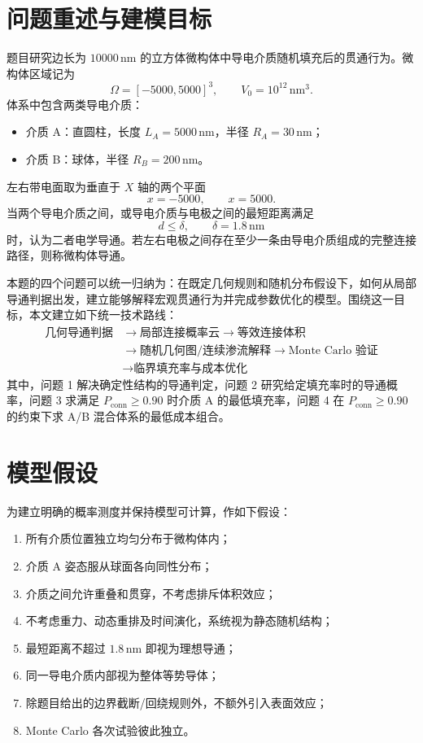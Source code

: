 
\section{问题重述与建模目标}

题目研究边长为 $10000\,\mathrm{nm}$ 的立方体微构体中导电介质随机填充后的贯通行为。微构体区域记为
\[
\Omega=[-5000,5000]^3,\qquad V_0=10^{12}\,\mathrm{nm}^3.
\]
体系中包含两类导电介质：
\begin{itemize}
    \item 介质 A：直圆柱，长度 $L_A=5000\,\mathrm{nm}$，半径 $R_A=30\,\mathrm{nm}$；
    \item 介质 B：球体，半径 $R_B=200\,\mathrm{nm}$。
\end{itemize}
左右带电面取为垂直于 $X$ 轴的两个平面
\[
x=-5000,\qquad x=5000.
\]
当两个导电介质之间，或导电介质与电极之间的最短距离满足
\[
d\le \delta,\qquad \delta=1.8\,\mathrm{nm}
\]
时，认为二者电学导通。若左右电极之间存在至少一条由导电介质组成的完整连接路径，则称微构体导通。

本题的四个问题可以统一归纳为：在既定几何规则和随机分布假设下，如何从局部导通判据出发，建立能够解释宏观贯通行为并完成参数优化的模型。围绕这一目标，本文建立如下统一技术路线：
\[
\boxed{
\begin{aligned}
\text{几何导通判据}
&\rightarrow
\text{局部连接概率云}
\rightarrow
\text{等效连接体积}\\
&\rightarrow
\text{随机几何图/连续渗流解释}
\rightarrow
\text{Monte Carlo 验证}\\
&\rightarrow
\text{临界填充率与成本优化}
\end{aligned}
}
\]
其中，问题 1 解决确定性结构的导通判定，问题 2 研究给定填充率时的导通概率，问题 3 求满足 $P_{\mathrm{conn}}\ge 0.90$ 时介质 A 的最低填充率，问题 4 在 $P_{\mathrm{conn}}\ge 0.90$ 的约束下求 A/B 混合体系的最低成本组合。

\section{模型假设}

为建立明确的概率测度并保持模型可计算，作如下假设：
\begin{enumerate}
    \item 所有介质位置独立均匀分布于微构体内；
    \item 介质 A 姿态服从球面各向同性分布；
    \item 介质之间允许重叠和贯穿，不考虑排斥体积效应；
    \item 不考虑重力、动态重排及时间演化，系统视为静态随机结构；
    \item 最短距离不超过 $1.8\,\mathrm{nm}$ 即视为理想导通；
    \item 同一导电介质内部视为整体等势导体；
    \item 除题目给出的边界截断/回绕规则外，不额外引入表面效应；
    \item Monte Carlo 各次试验彼此独立。
\end{enumerate}

